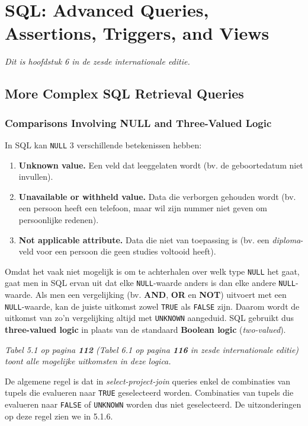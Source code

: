 \chapter{SQL: Advanced Queries, Assertions, Triggers, and Views}
\textit{Dit is hoofdstuk 6 in de zesde internationale editie.}
\section{More Complex SQL Retrieval Queries}
\subsection{Comparisons Involving NULL and Three-Valued Logic}
In SQL kan \texttt{NULL} 3 verschillende betekenissen hebben:
\begin{enumerate}
\item \textbf{Unknown value.} Een veld dat leeggelaten wordt (bv. de geboortedatum niet invullen).
\item \textbf{Unavailable or withheld value.} Data die verborgen gehouden wordt (bv. een persoon heeft een telefoon, maar wil zijn nummer niet geven om persoonlijke redenen).
\item \textbf{Not applicable attribute.} Data die niet van toepassing is (bv. een \textit{diploma}-veld voor een persoon die geen studies voltooid heeft).
\end{enumerate}
Omdat het vaak niet mogelijk is om te achterhalen over welk type \texttt{NULL} het gaat, gaat men in SQL ervan uit dat elke \texttt{NULL}-waarde anders is dan elke andere \texttt{NULL}-waarde. Als men een vergelijking (bv. \textbf{AND}, \textbf{OR} en \textbf{NOT}) uitvoert met een \texttt{NULL}-waarde, kan de juiste uitkomst zowel \texttt{TRUE} als \texttt{FALSE} zijn. Daarom wordt de uitkomst van zo'n vergelijking altijd met \texttt{UNKNOWN} aangeduid. SQL gebruikt dus \textbf{three-valued logic} in plaats van de standaard \textbf{Boolean logic} (\textit{two-valued}).

\textit{Tabel 5.1 op pagina \textbf{112} (Tabel 6.1 op pagina \textbf{116} in zesde internationale editie) toont alle mogelijke uitkomsten in deze logica.}

De algemene regel is dat in \textit{select-project-join} queries enkel de combinaties van tupels die evalueren naar \texttt{TRUE} geselecteerd worden. Combinaties van tupels die evalueren naar \texttt{FALSE} of \texttt{UNKNOWN} worden dus niet geselecteerd. De uitzonderingen op deze regel zien we in 5.1.6.


